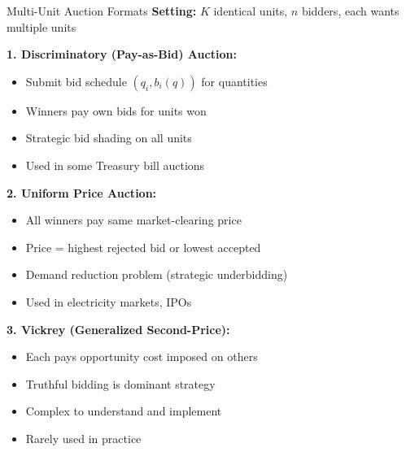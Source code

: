 \documentclass[xcolor={x11names}]{beamer}
\begin{document}
\begin{frame}{Multi-Unit Auction Formats}
\textbf{Setting:} $K$ identical units, $n$ bidders, each wants multiple units


\textbf{1. Discriminatory (Pay-as-Bid) Auction:}
\begin{itemize}
  \item Submit bid schedule $(q_i, b_i(q))$ for quantities
  \item Winners pay own bids for units won
  \item Strategic bid shading on all units
  \item Used in some Treasury bill auctions
\end{itemize}

\textbf{2. Uniform Price Auction:}
\begin{itemize}
  \item All winners pay same market-clearing price
  \item Price = highest rejected bid or lowest accepted
  \item Demand reduction problem (strategic underbidding)
  \item Used in electricity markets, IPOs
\end{itemize}

\textbf{3. Vickrey (Generalized Second-Price):}
\begin{itemize}
  \item Each pays opportunity cost imposed on others
  \item Truthful bidding is dominant strategy
  \item Complex to understand and implement
  \item Rarely used in practice
\end{itemize}
\end{frame}
\end{document}
